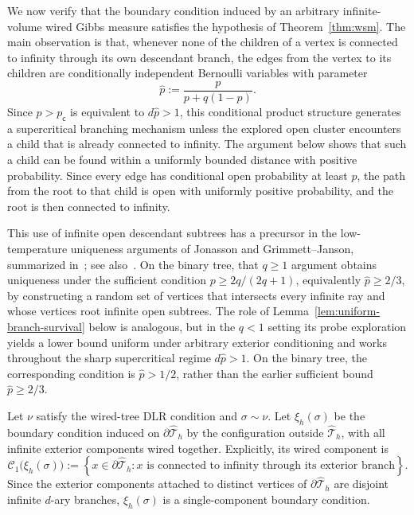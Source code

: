 \documentclass[11pt]{amsart}
\theoremstyle{plain}
\theoremstyle{definition}
\theoremstyle{remark}
\newcommand{\dreg}{\widehat {\mathcal T}_h}
\newcommand{\pc}{p_{\mathsf{c}}}
\begin{document}
We now verify that the boundary condition induced by an arbitrary infinite-volume wired Gibbs measure satisfies the hypothesis of Theorem~\ref{thm:wsm}. The main observation is that, whenever none of the children of a vertex is connected to infinity through its own descendant branch, the edges from the vertex to its children are conditionally independent Bernoulli variables with parameter
\[
    \widehat p
    :=
    \frac{p}{p+q(1-p)}.
\]
Since $p>\pc$ is equivalent to $d\widehat p>1$, this conditional product structure generates a supercritical branching mechanism unless the explored open cluster encounters a child that is already connected to infinity. The argument below shows that such a child can be found within a uniformly bounded distance with positive probability. Since every edge has conditional open probability at least $p$, the path from the root to that child is open with uniformly positive probability, and the root is then connected to infinity.

This use of infinite open descendant subtrees has a precursor in the low-temperature uniqueness arguments of Jonasson and Grimmett--Janson, summarized in~\cite[Theorem~10.98]{grimmett2006randomcluster}; see also~\cite{grimmettJanson2005branching,jonasson1999general}. On the binary tree, that $q\ge1$ argument obtains uniqueness under the sufficient condition $p\ge 2q/(2q+1)$, equivalently $\widehat p\ge2/3$, by constructing a random set of vertices that intersects every infinite ray and whose vertices root infinite open subtrees. The role of Lemma~\ref{lem:uniform-branch-survival} below is analogous, but in the $q<1$ setting its probe exploration yields a lower bound uniform under arbitrary exterior conditioning and works throughout the sharp supercritical regime $d\widehat p>1$. On the binary tree, the corresponding condition is $\widehat p>1/2$, rather than the earlier sufficient bound $\widehat p\ge2/3$.

Let $\nu$ satisfy the wired-tree DLR condition and $\sigma\sim\nu$. Let $\xi_h(\sigma)$ be the boundary condition induced on $\partial\dreg$ by the configuration outside $\dreg$, with all infinite exterior components wired together. Explicitly, its wired component is
\[
    \mathcal C_1\bigl(\xi_h(\sigma)\bigr)
    :=
    \left\{
        x\in\partial\dreg:
        x\text{ is connected to infinity through its exterior branch}
    \right\}.
\]
Since the exterior components attached to distinct vertices of $\partial\dreg$ are disjoint infinite $d$-ary branches, $\xi_h(\sigma)$ is a single-component boundary condition.
\end{document}
